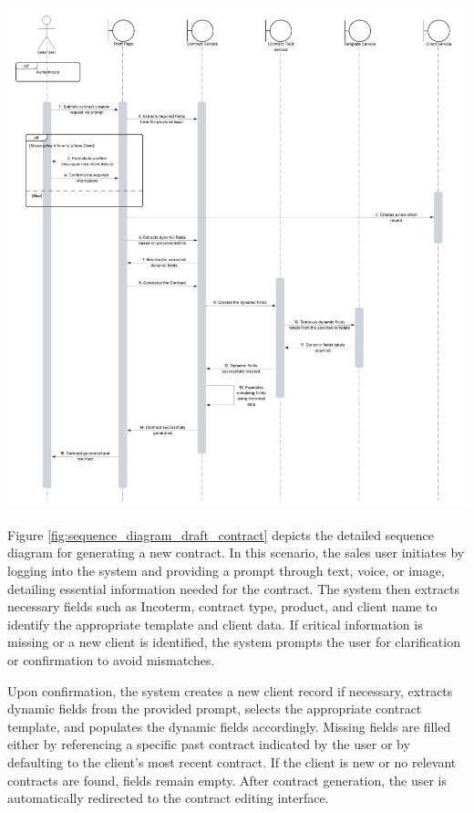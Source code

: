 \begin{center}
    \centering
    \includegraphics[width=1\textwidth]{Images/Sequence Diagram - Draft Contract.png}
    \label{fig:sequence_diagram_draft_contract}
\end{center}

Figure \ref{fig:sequence_diagram_draft_contract} depicts the detailed sequence diagram for generating a new contract. In this scenario, the sales user initiates by logging into the system and providing a prompt through text, voice, or image, detailing essential information needed for the contract. The system then extracts necessary fields such as Incoterm, contract type, product, and client name to identify the appropriate template and client data. If critical information is missing or a new client is identified, the system prompts the user for clarification or confirmation to avoid mismatches.\mynewline

Upon confirmation, the system creates a new client record if necessary, extracts dynamic fields from the provided prompt, selects the appropriate contract template, and populates the dynamic fields accordingly. Missing fields are filled either by referencing a specific past contract indicated by the user or by defaulting to the client's most recent contract. If the client is new or no relevant contracts are found, fields remain empty. After contract generation, the user is automatically redirected to the contract editing interface.

